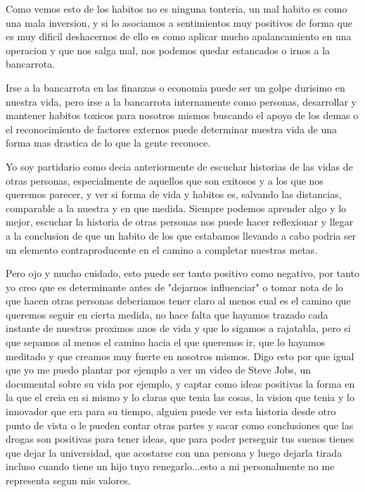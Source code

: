 Como vemos esto de los habitos no es ninguna tonteria, un mal habito es como una mala inversion, y si lo asociamos a sentimientos muy positivos de forma que es muy dificil deshacernos de ello es como aplicar mucho apalancamiento en una operacion y que nos salga mal, nos podemos quedar estancados o irnos a la bancarrota.

Irse a la bancarrota en las finanzas o economia puede ser un golpe durisimo en nuestra vida, pero irse a la bancarrota internamente como personas, desarrollar y mantener habitos toxicos para nosotros mismos buscando el apoyo de los demas o el reconocimiento de factores externos puede determinar nuestra vida de una forma mas drastica de lo que la gente reconoce. 

Yo soy partidario como decia anteriormente de escuchar historias de las vidas de otras personas, especialmente de aquellos que son exitosos y a los que nos queremos parecer, y ver si forma de vida y habitos es, salvando las distancias, comparable a la nuestra y en que medida. Siempre podemos aprender algo y lo mejor, escuchar la historia de otras personas nos puede hacer reflexionar y llegar a la conclusion de que un habito de los que estabamos llevando a cabo podria ser un elemento contraproducente en el camino a completar nuestras metas.

Pero ojo y mucho cuidado, esto puede ser tanto positivo como negativo, por tanto yo creo que es determinante antes de "dejarnos influenciar" o tomar nota de lo que hacen otras personas deberiamos tener claro al menos cual es el camino que queremos seguir en cierta medida, no hace falta que hayamos trazado cada instante de nuestros proximos anos de vida y que lo sigamos a rajatabla, pero si que sepamos al menos el camino hacia el que queremos ir, que lo hayamos meditado y que creamos muy fuerte en nosotros mismos. Digo esto por que igual que yo me puedo plantar por ejemplo a ver un video de Steve Jobs, un documental sobre su vida por ejemplo, y captar como ideas positivas la forma en la que el creia en si mismo y lo claras que tenia las cosas, la vision que tenia y lo innovador que era para su tiempo, alguien puede ver esta historia desde otro punto de vista o le pueden contar otras partes y sacar como conclusiones que las drogas son positivas para tener ideas, que para poder perseguir tus suenos tienes que dejar la universidad, que acostarse con una persona y luego dejarla tirada incluso cuando tiene un hijo tuyo renegarlo...esto a mi personalmente no me representa segun mis valores.

